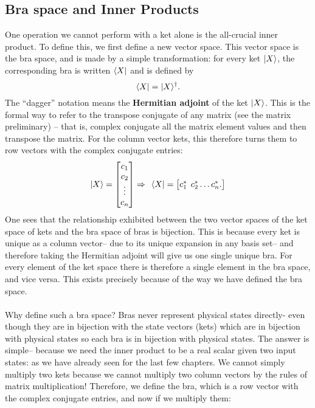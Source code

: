 \subsection{Bra space and Inner Products}
One operation we cannot perform with a ket alone is the all-crucial inner product. To define this, we first define a new vector space. This vector space is the bra space, and is made by a simple transformation: for every ket $|X\rangle$, the corresponding bra is written $\langle X|$ and is defined by
$$
\langle X|=|X\rangle^{\dagger}.
$$
The ``dagger'' notation means the \textbf{Hermitian adjoint} of the ket $|X\rangle$. This is the formal way to refer to the transpose conjugate of any matrix (see the matrix preliminary) -- that is, complex conjugate all the matrix element values and then transpose the matrix. For the column vector kets, this therefore turns them to row vectors with the complex conjugate entries:
$$
|X\rangle=\begin{bmatrix}
c_{1}\\
c_{2}\\
\vdots\\
c_{n}\\
\end{bmatrix}\Rightarrow\:\:\langle X|=\begin{bmatrix}
c^{\ast}_{1}\:\: c^{\ast}_{2} \dots c^{\ast}_{n}.
\end{bmatrix}
$$
One sees that the relationship exhibited between the two vector spaces of the ket space of kets and the bra space of bras is bijection. This is because every ket is unique as a column vector-- due to its unique expansion in any basis set-- and therefore taking the Hermitian adjoint will give us one single unique bra. For every element of the ket space there is therefore a single element in the bra space, and vice versa. This exists precisely because of the way we have defined the bra space.
\\\\
Why define such a bra space? Bras never represent physical states directly- even though they are in bijection with the state vectors (kets) which are in bijection with physical states so each bra is in bijection with physical states. The answer is simple-- because we need the inner product to be a real scalar given two input states: as we have already seen for the last few chapters. We cannot simply multiply two kets because we cannot multiply two column vectors by the rules of matrix multiplication! Therefore, we define the bra, which is a row vector with the complex conjugate entries, and now if we multiply them:
